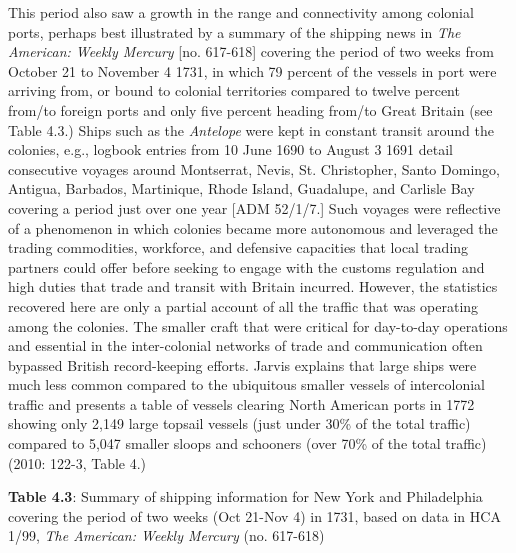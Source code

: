 \begin{styleStandard}
This period also saw a growth in the range and connectivity among colonial ports, perhaps best illustrated by a summary of the shipping news in \textit{The American: Weekly Mercury} [no. 617-618] covering the period of two weeks from October 21 to November 4 1731, in which 79 percent of the vessels in port were arriving from, or bound to colonial territories compared to twelve percent from/to foreign ports and only five percent heading from/to Great Britain (see Table 4.3.) Ships such as the \textit{Antelope} were kept in constant transit around the colonies, e.g., logbook entries from 10 June 1690 to August 3 1691 detail consecutive voyages around Montserrat, Nevis, St. Christopher, Santo Domingo, Antigua, Barbados, Martinique, Rhode Island, Guadalupe, and Carlisle Bay covering a period just over one year [ADM 52/1/7.] Such voyages were reflective of a phenomenon in which colonies became more autonomous and leveraged the trading commodities, workforce, and defensive capacities that local trading partners could offer before seeking to engage with the customs regulation and high duties that trade and transit with Britain incurred. However, the statistics recovered here are only a partial account of all the traffic that was operating among the colonies. The smaller craft that were critical for day-to-day operations and essential in the inter-colonial networks of trade and communication often bypassed British record-keeping efforts. Jarvis explains that large ships were much less common compared to the ubiquitous smaller vessels of intercolonial traffic and presents a table of vessels clearing North American ports in 1772 showing only 2,149 large topsail vessels (just under 30\% of the total traffic) compared to 5,047 smaller sloops and schooners (over 70\% of the total traffic) (2010: 122-3, Table 4.) 
\end{styleStandard}

\begin{styleStandard}
\textbf{Table 4.3}: Summary of shipping information for New York and Philadelphia covering the period of two weeks (Oct 21-Nov 4) in 1731, based on data in HCA 1/99, \textit{The American: Weekly Mercury} (no. 617-618) 
\end{styleStandard}

\begin{styleStandard}
  [Warning: Image ignored] %
 
\end{styleStandard}

